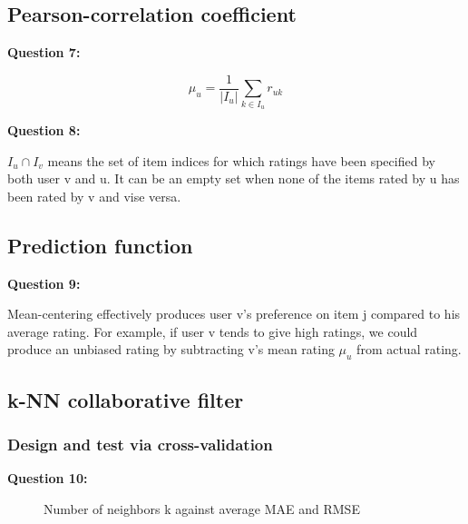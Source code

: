 \documentclass{article}
\begin{document}
\subsection{Pearson-correlation coefficient}

\bigbreak \textbf{Question 7:}

\[\mu_u=\frac{1}{|I_u|}\sum_{k{\in}I_u} r_{uk}\]
\newline

\bigbreak \textbf{Question 8:}

${I_u}{\cap}{I_v}$ means the set of item indices for which ratings have been specified by both user v and u. It can be an empty set when none of the items rated by u has been rated by v and vise versa.
\newline

\subsection{Prediction function}

\bigbreak \textbf{Question 9:}

Mean-centering effectively produces user v's preference on item j compared to his average rating. For example, if user v tends to give high ratings, we could produce an unbiased rating by subtracting v's mean rating ${\mu}_{u}$ from actual rating.
\newline

\subsection{k-NN collaborative filter}

\subsubsection{Design and test via cross-validation}

\bigbreak \textbf{Question 10:}

\begin{figure}
\centering
{}
\caption{Number of neighbors k against average MAE and RMSE} \label{Q10}
\end{figure}
\end{document}
